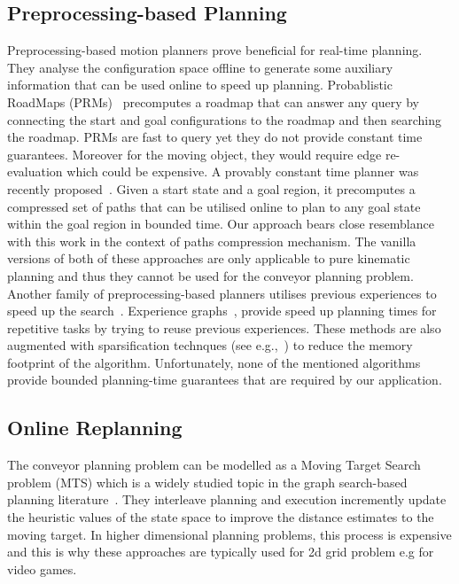 \documentclass[conference]{IEEEtran}
\begin{document}
\subsection{Preprocessing-based Planning}
Preprocessing-based motion planners prove beneficial for real-time planning. They analyse the configuration space offline to generate some auxiliary information that can be used online to speed up planning. Probablistic RoadMaps (PRMs)~\cite{kavraki1996probabilistic} precomputes a roadmap that can answer any query by connecting the start and goal configurations to the roadmap and then searching the roadmap. PRMs are fast to query yet they do not provide constant time guarantees.
Moreover for the moving object, they would require edge re-evaluation which could be expensive.
%
A provably constant time planner was recently proposed~\cite{islam2019planning}. Given a start state and a goal region, it precomputes a compressed set of paths that can be utilised online to plan to any goal state within the goal region in bounded time. Our approach bears close resemblance with this work in the context of paths compression mechanism.
The vanilla versions of both of these approaches are only applicable to pure kinematic planning and thus they cannot be used for the conveyor planning problem.
%
Another family of preprocessing-based planners utilises previous experiences to speed up the search~\cite{BAG12,CSMOC15,PCCL12}. Experience graphs~\cite{PCCL12}, provide speed up planning times for repetitive tasks by trying to reuse previous experiences. These methods are also augmented with sparsification technques (see e.g.,~\cite{DB14,SSAH14}) to reduce the memory footprint of the algorithm.
Unfortunately, none of the mentioned algorithms provide bounded planning-time guarantees that are required by our application.

\subsection{Online Replanning}
The conveyor planning problem can be modelled as a Moving Target Search problem (MTS) which is a widely studied topic in the graph search-based planning literature~\cite{ishida1991moving,ishida1995moving,koenig2007speeding,sun2010moving}. 
They interleave planning and execution incremently update the heuristic values of the state space to improve the distance estimates to the moving target. In higher dimensional planning problems, this process is expensive and this is why these approaches are typically used for 2d grid problem e.g for video games.
\end{document}
